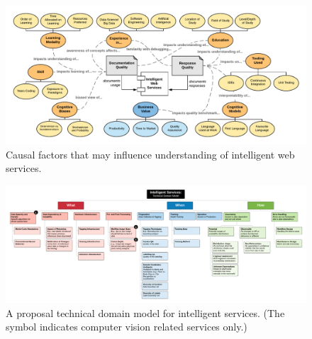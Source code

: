 \begin{landscape}
\begin{figure}[p!]
\centering
\caption[Causal factors that may influence understanding of intelligent web services]{Causal factors that may influence understanding of intelligent web services.}
\label{fig:additional:tdm-causal-factors}
\includegraphics[width=\linewidth]{appendix/figures/tdm-causal-factors}
\end{figure}

\begin{figure}[p!]
\centering
\caption[A proposal technical domain model for intelligent services]{A proposal technical domain model for intelligent services. (The \faInfoCircle{} symbol indicates computer vision related services only.)}
\label{fig:additional:propsed-tdm}
\includegraphics[width=\linewidth]{appendix/figures/proposed-tdm}
\end{figure}
\end{landscape}

